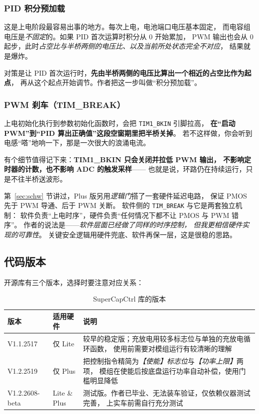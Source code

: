 \documentclass[cn,blue,11pt,device=normal]{elegantnote}
\begin{document}
\subsubsection{PID 积分预加载}

这是上电阶段最容易出事的地方。每次上电，电池端口电压基本固定，
而电容组电压是\emph{不固定}的。如果 PID 首次运算时积分从 $0$ 开始累加，
PWM 输出也会从 $0$ 起步，此时\emph{占空比与半桥两侧的电压比、以及当前所处状态完全不对应}，
结果就是爆炸。

对策是让 PID 首次运行时，\textbf{先由半桥两侧的电压比算出一个相近的占空比作为起点}，
再从这个起点开始调节。作者把这一步叫做“积分预加载”。

\subsubsection{PWM 刹车（TIM\_BREAK）}

上电初始化执行到参数初始化函数时，会把 \texttt{TIM1\_\allowbreak{}BKIN} 引脚拉高，
\textbf{在“启动 PWM”到“PID 算出正确值”这段空窗期里把半桥关掉}。
若不这样做，你会听到电感“嗒”地响一下，那是一次很大的浪涌电流。

有个细节值得记下来：\textbf{TIM1\_BKIN 只会关闭并拉低 PWM 输出，
不影响定时器的计数，也不影响 ADC 的触发采样}——
也就是说，环路仍在持续运行，只是不往半桥送波形。

\begin{note}[与前文硬件保护的分工]
第~\ref{sec:schw} 节讲过，Plus 版另用\emph{逻辑门}搭了一套硬件延迟电路，
保证 PMOS 先于 PWM 导通、后于 PWM 关断。
软件侧的 \texttt{TIM\_\allowbreak{}BREAK} 与它是两套独立机制：
软件负责“上电时序”，硬件负责“任何情况下都不让 PMOS 与 PWM 错序”。
作者的说法是——\emph{软件层面已经做了同样的时序控制，
但我更相信硬件实现的可靠性}。
关键安全逻辑用硬件兜底、软件再保一层，这是很稳的思路。
\end{note}

\subsection{代码版本}

开源库有三个版本，选择时要注意对应关系：

\begin{table}[htbp]
  \centering
  \small
  \caption{SuperCapCtrl 库的版本}
  \label{tab:sclibver}
  \begin{tabular}{@{}>{\raggedright\arraybackslash}p{}>{\raggedright\arraybackslash}p{}>{\raggedright\arraybackslash}p{}@{}}
    \toprule
    版本 & 适用硬件 & 说明 \\
    \midrule
    V1.1.2517 & 仅 Lite &
    较早的稳定版；充放电用较多标志位与单独的充放电循环函数，
    使用前需要对模组运行有较清晰的理解 \\[4pt]
    V1.2.2519 & 仅 Plus &
    把控制指令精简为\emph{【使能】标志位}与\emph{【功率上限】}两项，
    模组在使能后按底盘运行功率自动补偿，使用门槛明显降低 \\[4pt]
    V1.2.2608-beta & Lite \& Plus &
    测试版。作者已毕业、无法装车验证，仅依赖仪器测试完善，
    上实车前需自行充分测试 \\
    \bottomrule
  \end{tabular}
\end{table}
\end{document}
